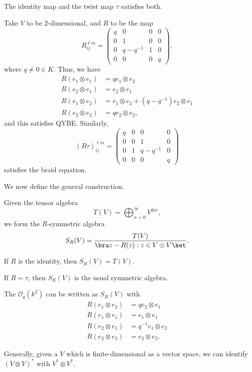 \documentclass[a4paper]{article}
\begin{document}
\begin{eg}
  The identity map and the twist map $\tau$ satisfies both.

  Take $V$ to be $2$-dimensional, and $R$ to be the map
  \[
    R_{ij}^{\ell m} =
    \begin{pmatrix}
      q & 0 & 0 & 0\\
      0 & 1 & 0 & 0\\
      0 & q - q^{-1} & 1 & 0\\
      0 & 0 & 0 & q
    \end{pmatrix},
  \]
  where $q \not= 0 \in K$. Thus, we have
  \begin{align*}
    R(e_1 \otimes e_1) &= q e_1 \otimes e_2\\
    R(e_2 \otimes e_1) &= e_2 \otimes e_1\\
    R(e_1 \otimes e_2) &= e_1 \otimes e_2 + (q - q^{-1}) e_2 \otimes e_1\\
    R(e_2 \otimes e_2) &= q e_2 \otimes e_2,
  \end{align*}
  and this satisfies QYBE. Similarly,
  \[
    (R \tau)^{\ell m}_{ij} =
    \begin{pmatrix}
      q & 0 & 0 & 0\\
      0 & 0 & 1 & 0\\
      0 & 1 & q - q^{-1} & 0\\
      0 & 0 & 0 & q
    \end{pmatrix}
  \]
  satisfies the braid equation.
\end{eg}
We now define the general construction.
\begin{defi}
  Given the tensor algebra
  \[
    T(V) = \bigoplus_{n = 0}^\infty V^{\otimes n},
  \]
  we form the $R$-symmetric algebra
  \[
    S_{R}(V) = \frac{T(V)}{\bra z - R(z): z \in V \otimes V\ket}.
  \]
\end{defi}
\begin{eg}
  If $R$ is the identity, then $S_R(V) = T(V)$.
\end{eg}
\begin{eg}
  If $R = \tau$, then $S_R(V)$ is the usual symmetric algebra.
\end{eg}

\begin{eg}
  The  $\mathcal{O}_q(k^2)$ can be written as $S_R(V)$ with
  \begin{align*}
    R(e_1 \otimes e_2) &= q e_2 \otimes e_1\\
    R(e_1 \otimes e_1) &= e_1 \otimes e_1\\
    R(e_2 \otimes e_1) &= q^{-1} e_1 \otimes e_2\\
    R(e_2 \otimes e_2) &= e_2 \otimes e_2.
  \end{align*}
\end{eg}
Generally, given a $V$ which is finite-dimensional as a vector space, we can identify $(V \otimes V)^*$ with $V^* \otimes V^*$.
\end{document}
